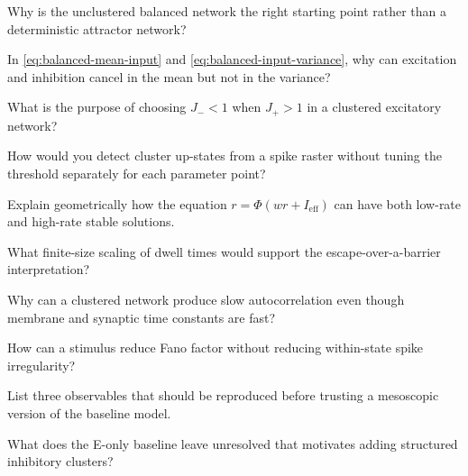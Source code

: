 \begin{conceptquestions}
  \item Why is the unclustered balanced network the right starting point rather than a deterministic attractor network?
  \item In \cref{eq:balanced-mean-input} and \cref{eq:balanced-input-variance}, why can excitation and inhibition cancel in the mean but not in the variance?
  \item What is the purpose of choosing $J_-<1$ when $J_+>1$ in a clustered excitatory network?
  \item How would you detect cluster up-states from a spike raster without tuning the threshold separately for each parameter point?
  \item Explain geometrically how the equation $r=\Phi(wr+I_{\mathrm{eff}})$ can have both low-rate and high-rate stable solutions.
  \item What finite-size scaling of dwell times would support the escape-over-a-barrier interpretation?
  \item Why can a clustered network produce slow autocorrelation even though membrane and synaptic time constants are fast?
  \item How can a stimulus reduce Fano factor without reducing within-state spike irregularity?
  \item List three observables that should be reproduced before trusting a mesoscopic version of the baseline model.
  \item What does the E-only baseline leave unresolved that motivates adding structured inhibitory clusters?
\end{conceptquestions}

\clearpage
